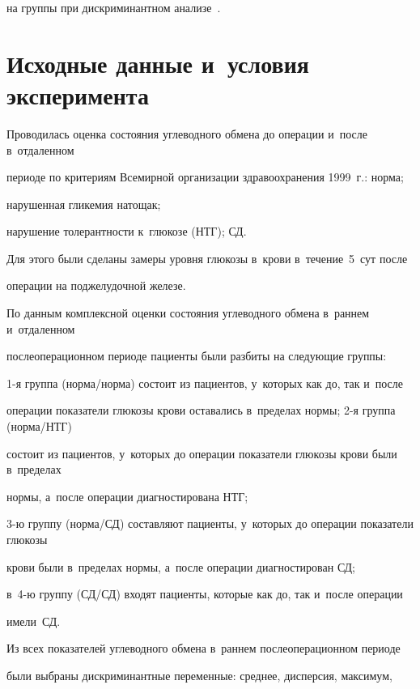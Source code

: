 на группы при дискриминантном анализе~\cite{halafyan}.






\section{Исходные данные и~условия эксперимента}

\label{data}



Проводилась оценка состояния углеводного обмена до операции и~после в~отдаленном 

периоде по критериям Всемирной организации здравоохранения 1999~г.: норма; 

нарушенная гликемия натощак; 

нарушение толерантности к~глюкозе (НТГ); СД. 

Для этого были сделаны замеры уровня глюкозы в~крови в~течение~5~сут после 

операции на поджелудочной железе.



По данным комплексной оценки состояния углеводного обмена в~раннем и~отдаленном

 послеоперационном периоде пациенты были разбиты на следующие группы: 

 1-я группа (нор\-ма/нор\-ма) состоит из пациентов, у~которых как до, так и~после 

 операции показатели глюкозы крови оставались в~пределах нормы; 2-я группа (норма/НТГ) 

 состоит из пациентов, у~которых до операции показатели глюкозы крови были в~пределах 

 нормы, а~после операции диагностирована НТГ; 

 3-ю группу (норма/СД) составляют пациенты, у~которых до операции показатели глюкозы 

 крови были в~пределах нормы, а~после операции диагностирован СД; 

 в~4-ю группу (СД/СД) входят пациенты, которые как до, так и~после операции 

 имели~СД.



Из всех показателей углеводного обмена в~раннем послеоперационном периоде 

были выбраны дискриминантные переменные: среднее, дисперсия, максимум, 

